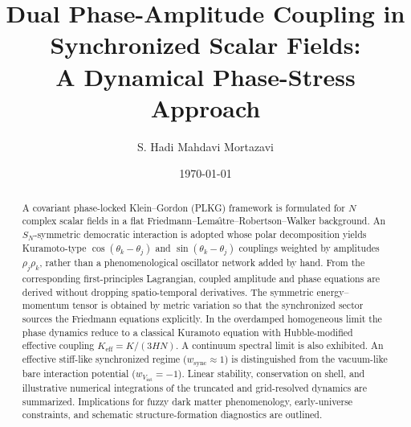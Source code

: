 
\title{Dual Phase-Amplitude Coupling in Synchronized Scalar Fields:\\
A Dynamical Phase-Stress Approach}

\author{S. Hadi Mahdavi Mortazavi}

\date{\today}

\begin{abstract}
A covariant phase-locked Klein--Gordon (PLKG) framework is formulated for $N$ complex scalar fields in a flat Friedmann--Lema\^{\i}tre--Robertson--Walker background.
An $S_N$-symmetric democratic interaction is adopted whose polar decomposition yields Kuramoto-type $\cos(\theta_k-\theta_j)$ and $\sin(\theta_k-\theta_j)$ couplings weighted by amplitudes $\rho_j\rho_k$, rather than a phenomenological oscillator network added by hand.
From the corresponding first-principles Lagrangian, coupled amplitude and phase equations are derived without dropping spatio-temporal derivatives.
The symmetric energy--momentum tensor is obtained by metric variation so that the synchronized sector sources the Friedmann equations explicitly.
In the overdamped homogeneous limit the phase dynamics reduce to a classical Kuramoto equation with Hubble-modified effective coupling $K_{\mathrm{eff}}=K/(3HN)$.
A continuum spectral limit is also exhibited.
An effective stiff-like synchronized regime ($w_{\mathrm{sync}}\approx 1$) is distinguished from the vacuum-like bare interaction potential ($w_{V_{\mathrm{int}}}=-1$).
Linear stability, conservation on shell, and illustrative numerical integrations of the truncated and grid-resolved dynamics are summarized.
Implications for fuzzy dark matter phenomenology, early-universe constraints, and schematic structure-formation diagnostics are outlined.
\end{abstract}
